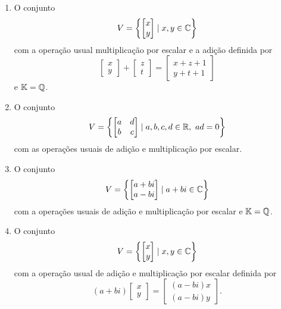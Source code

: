 \documentclass[12pt]{exam}
\begin{document}
\begin{exercicio}
\begin{enumerate}[label={\alph*)}]
    \item O conjunto
      \[
         V = \left\{\begin{bmatrix}x\\y \end{bmatrix} \mid x, y \in \mathbb{C}\right\}
      \]
      com a operação usual multiplicação por escalar e a adição definida por
      \[
        \begin{bmatrix}x\\y\end{bmatrix} + \begin{bmatrix} z\\t\end{bmatrix} = \begin{bmatrix}x + z + 1\\y + t + 1\end{bmatrix}
      \]
      e $\mathbb{K} = \mathbb{Q}$.

    \item O conjunto
      \[
        V = \left\{\begin{bmatrix}a & d\\b & c \end{bmatrix} \mid a, b, c, d \in \mathbb{R},\ ad = 0 \right\}
      \]
      com as operações usuais de adição e multiplicação por escalar.

    \item O conjunto
      \[
         V = \left\{\begin{bmatrix}a + bi\\a - bi \end{bmatrix} \mid a + bi \in \mathbb{C}\right\}
      \]
      com a operações usuais de adição e multiplicação por escalar e $\mathbb{K} = \mathbb{Q}$.

    \item O conjunto
      \[
         V = \left\{\begin{bmatrix}x\\y \end{bmatrix} \mid x, y \in \mathbb{C}\right\}
      \]
      com a operação usual de adição e multiplicação por escalar definida por
      \[
        (a + bi)\begin{bmatrix}x\\y\end{bmatrix} = \begin{bmatrix}(a - bi)x\\(a - bi)y\end{bmatrix}.
      \]


  \end{enumerate}
\end{exercicio}
\end{document}
